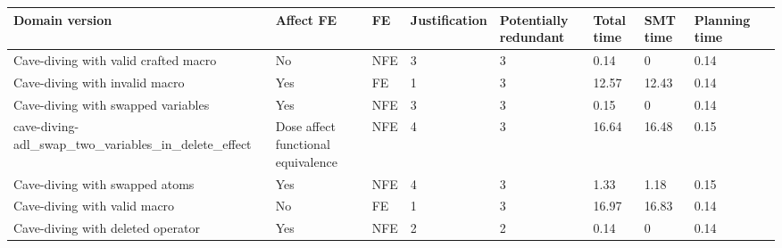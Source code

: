 \begin{table}[] 
\begin{tabular}{|l|l|l|l|l|l|l|l|l|} 
\hline 
\textbf{Domain version}  & \textbf{Affect FE} & \textbf{FE} & \textbf{Justification} &  \textbf{Potentially redundant} & \textbf{Total time}  & \textbf{SMT time}  & \textbf{Planning time}    \\ \hline 
Cave-diving with valid crafted macro & No & NFE & 3 & 3 & 0.14 & 0 & 0.14 \\  \hline
Cave-diving with invalid macro & Yes & FE & 1 & 3 & 12.57 & 12.43 & 0.14 \\  \hline
Cave-diving with swapped variables & Yes & NFE & 3 & 3 & 0.15 & 0 & 0.14 \\  \hline
cave-diving-adl_swap_two_variables_in_delete_effect & Dose affect functional equivalence & NFE & 4 & 3 & 16.64 & 16.48 & 0.15 \\  \hline
Cave-diving with swapped atoms & Yes & NFE & 4 & 3 & 1.33 & 1.18 & 0.15 \\  \hline
Cave-diving with valid macro & No & FE & 1 & 3 & 16.97 & 16.83 & 0.14 \\  \hline
Cave-diving with deleted operator & Yes & NFE & 2 & 2 & 0.14 & 0 & 0.14 \\  \hline
\end{tabular} 
\end{table} 
